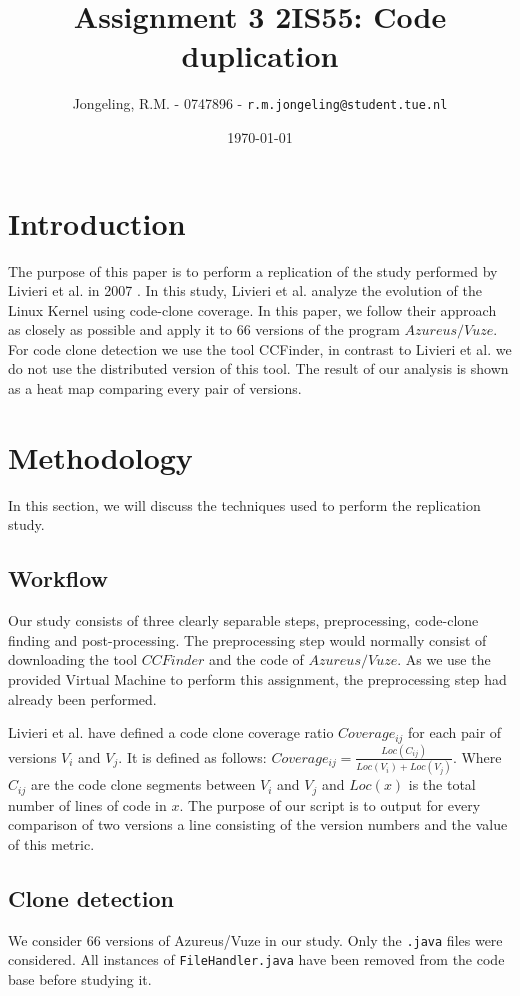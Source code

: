 \documentclass[a4paper,twoside, twocolumn, 11pt]{article}
\title{\vspace{-\baselineskip}\sffamily\bfseries Assignment 3 2IS55: Code duplication}
\author{Jongeling, R.M. - 0747896 - {\tt r.m.jongeling@student.tue.nl}}
\date{\today}
\numberwithin{equation}{section}
\begin{document}
\maketitle

\section{Introduction}
The purpose of this paper is to perform a replication of the study performed by Livieri et al. in 2007 \cite{paper}.
In this study, Livieri et al. analyze the evolution of the Linux Kernel using code-clone coverage.
In this paper, we follow their approach as closely as possible and apply it to 66 versions of the program $Azureus/Vuze$.
For code clone detection we use the tool CCFinder, in contrast to Livieri et al. we do not use the distributed version of this tool.
The result of our analysis is shown as a heat map comparing every pair of versions.

\section{Methodology}
In this section, we will discuss the techniques used to perform the replication study.

\subsection{Workflow}
Our study consists of three clearly separable steps, preprocessing, code-clone finding and post-processing.
The preprocessing step would normally consist of downloading the tool $CCFinder$ and the code of $Azureus/Vuze$.
As we use the provided Virtual Machine to perform this assignment, the preprocessing step had already been performed.

Livieri et al. have defined a code clone coverage ratio $Coverage_{ij}$ for each pair of versions $V_i$ and $V_j$. 
It is defined as follows: $Coverage_{ij} = \frac{Loc(C_{ij})}{Loc(V_i) + Loc(V_j)}$.
Where $C_{ij}$ are the code clone segments between $V_i$ and $V_j$ and $Loc(x)$ is the total number of lines of code in $x$.
The purpose of our script is to output for every comparison of two versions a line consisting of the version numbers and the value of this metric.

\subsection{Clone detection}
We consider 66 versions of Azureus/Vuze in our study. 
Only the \texttt{.java} files were considered.
All instances of \texttt{FileHandler.java} have been removed from the code base before studying it.
\end{document}
